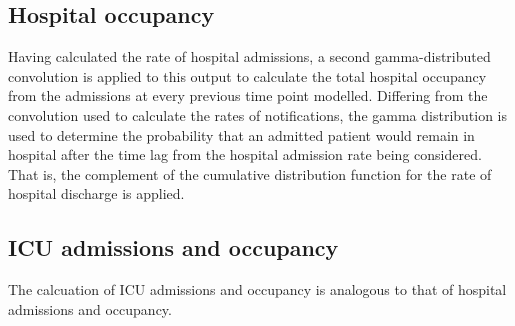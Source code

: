 \subsection{Hospital occupancy}
Having calculated the rate of hospital admissions,
a second gamma-distributed convolution is applied to this output to calculate
the total hospital occupancy from the admissions at every previous time point modelled.
Differing from the convolution used to calculate the rates of notifications,
the gamma distribution is used to determine the probability that an admitted patient
would remain in hospital after the time lag from the hospital admission rate being considered.
That is, the complement of the cumulative distribution function for the rate of hospital
discharge is applied.

\subsection{ICU admissions and occupancy}
The calcuation of ICU admissions and occupancy is analogous 
to that of hospital admissions and occupancy.
